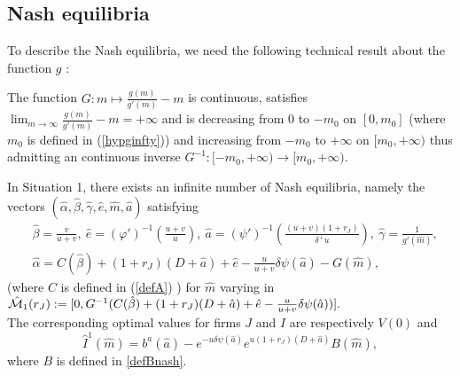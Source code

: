 \documentclass{svjour3}
\begin{document}
 
 

\subsection{Nash equilibria}\label{ssec:Nash}
To describe the Nash equilibria, we need the following technical result about the function $g$ :
\begin{lemma}
\label{Lemmalimginfty}
The function $G:m\mapsto \frac{g(m)}{g'(m)}-m$ is continuous, satisfies 
$\lim_{m\to\infty}\frac{g(m)}{g'(m)}-m=+\infty$
and is decreasing from $0$ to $-m_0$ on $[0,m_0]$ (where $m_0$ is defined in (\ref{hypginfty})) and increasing from $-m_0$ to $+\infty$ on $[m_0,+\infty)$ thus admitting an continuous inverse $G^{-1}:[-m_0,+\infty)\to [m_0,+\infty)$.
\end{lemma}

\begin{theorem}
\label{propnash1}
In Situation 1, there exists an infinite number of Nash equilibria, namely the vectors 
$(\hat\alpha, \hat\beta, \hat\gamma, \hat e,\hat m, \hat a)$ satisfying
\begin{eqnarray}
&\hat\beta=\frac{v}{u+v},~\hat e=(\varphi')^{-1}(\frac{u+v}{u}),~\hat a=
(\psi')^{-1}\left(\frac{(u+v)(1+r_J)}{\delta^+ u}\right),~ \hat\gamma=\frac{1}{g'(\hat m)}, 
\label{nash11}\\
&\hat\alpha=C(\hat \beta)+(1+r_J)(D+\hat a)+\hat e-\frac{u}{u+v}\delta\psi(\hat a)-G(\hat m),
\label{nash12}\end{eqnarray}
(where $C$ is defined in (\ref{defA}) 
)
for $\hat{m}$ varying in 
\\
$\hat{\cal M}_1(r_J):=[0,G^{-1}(C(\hat \beta)+(1+r_J)(D+\hat a)+\hat e-\frac{u}{u+v}\delta\psi(\hat a))].$
\\
The corresponding optimal values for firms $J$ and $I$ are respectively $V(0)$ and
$$\hat{I}^1(\hat{m})= b^a(\hat a)-e^{-u\delta\psi(\hat a)} e^{u(1+r_J)(D+\hat a)}B(\hat m),$$
where $B$ is defined in \eqref{defBnash}.
\end{theorem}
\end{document}
